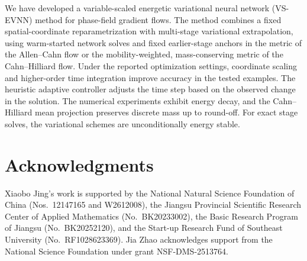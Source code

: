 \documentclass[11pt,letterpaper]{article}
\theoremstyle{plain}
\theoremstyle{definition}
\begin{document}
We have developed a variable-scaled energetic variational neural network (VS-EVNN) method for phase-field gradient flows. The method combines a fixed spatial-coordinate reparametrization with multi-stage variational extrapolation, using warm-started network solves and fixed earlier-stage anchors in the metric of the Allen--Cahn flow or the mobility-weighted, mass-conserving metric of the Cahn--Hilliard flow. Under the reported optimization settings, coordinate scaling and higher-order time integration improve accuracy in the tested examples. The heuristic adaptive controller adjusts the time step based on the observed change in the solution. The numerical experiments exhibit energy decay, and the Cahn--Hilliard mean projection preserves discrete mass up to round-off. For exact stage solves, the variational schemes are unconditionally energy stable.


\section*{Acknowledgments} Xiaobo Jing's work is supported by the National Natural Science Foundation of China (Nos.~12147165 and W2612008), the Jiangsu Provincial Scientific Research Center of Applied Mathematics (No.~BK20233002), the Basic Research Program of Jiangsu (No.~BK20252120), and the Start-up Research Fund of Southeast University (No.~RF1028623369). Jia Zhao acknowledges support from the National Science Foundation under grant NSF-DMS-2513764.




\end{document}
